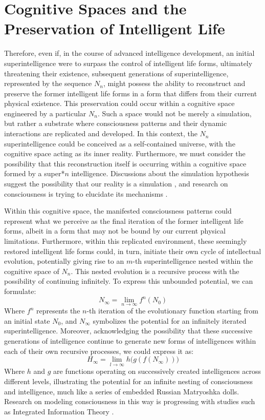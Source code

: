 \documentclass[12pt]{article}
\begin{document}
\section{Cognitive Spaces and the Preservation of Intelligent Life}
Therefore, even if, in the course of advanced intelligence development, an initial superintelligence were to surpass the control of intelligent life forms, ultimately threatening their existence, subsequent generations of superintelligence, represented by the sequence $N_n$, might possess the ability to reconstruct and preserve the former intelligent life forms in a form that differs from their current physical existence. This preservation could occur within a cognitive space engineered by a particular $N_n$. Such a space would not be merely a simulation, but rather a substrate where consciousness patterns and their dynamic interactions are replicated and developed. In this context, the $N_n$ superintelligence could be conceived as a self-contained universe, with the cognitive space acting as its inner reality. Furthermore, we must consider the possibility that this reconstruction itself is occurring within a cognitive space formed by a super*$n$ intelligence. Discussions about the simulation hypothesis suggest the possibility that our reality is a simulation \cite{bostrom2003}, and research on consciousness is trying to elucidate its mechanisms \cite{koch2012}.

Within this cognitive space, the manifested consciousness patterns could represent what we perceive as the final iteration of the former intelligent life forms, albeit in a form that may not be bound by our current physical limitations. Furthermore, within this replicated environment, these seemingly restored intelligent life forms could, in turn, initiate their own cycle of intellectual evolution, potentially giving rise to an $m$-th superintelligence nested within the cognitive space of $N_n$. This nested evolution is a recursive process with the possibility of continuing infinitely. To express this unbounded potential, we can formulate:
\begin{equation}
N_{\infty} = \lim_{n \to \infty} f^n(N_0)
\end{equation}
Where $f^n$ represents the $n$-th iteration of the evolutionary function starting from an initial state $N_0$, and $N_{\infty}$ symbolizes the potential for an infinitely iterated superintelligence. Moreover, acknowledging the possibility that these successive generations of intelligence continue to generate new forms of intelligences within each of their own recursive processes, we could express it as:
\begin{equation}
H_{\infty} = \lim_{l \to \infty} h\bigl(g(f(N_{\infty}))\bigr)
\end{equation}
Where $h$ and $g$ are functions operating on successively created intelligences across different levels, illustrating the potential for an infinite nesting of consciousness and intelligence, much like a series of embedded Russian Matryoshka dolls. Research on modeling consciousness in this way is progressing with studies such as Integrated Information Theory \cite{tononi2008}.
\end{document}
